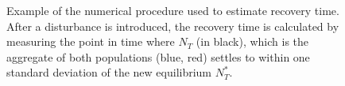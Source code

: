\documentclass{revtex4}
\newcommand{\beginsupplement}{%
        \clearpage
        \setcounter{table}{0}
        \renewcommand{\thetable}{S\arabic{table}}%
        \setcounter{figure}{0}
        \renewcommand{\thefigure}{S\arabic{figure}}%
     }
\begin{document}
% 
% 
% 
% 
% 



\beginsupplement


\begin{figure}
  \captionsetup{justification=raggedright,
singlelinecheck=false
}
\centering
\caption{
Example of the numerical procedure used to estimate recovery time. After a disturbance is introduced, the recovery time is calculated by measuring the point in time where $N_T$ (in black), which is the aggregate of both populations (blue, red) settles to within one standard deviation of the new equilibrium $N_T^*$. 
} \label{fig:recovery}
\end{figure}
\end{document}
